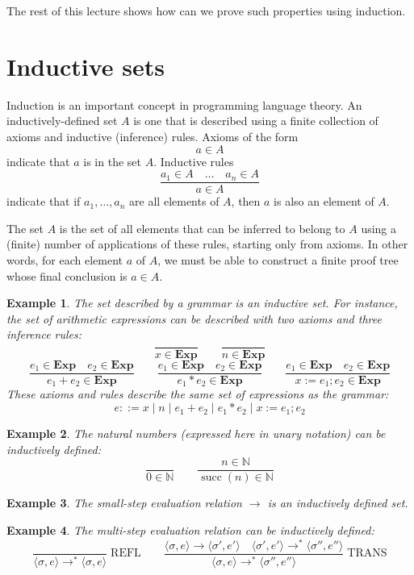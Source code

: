 \documentclass[11pt]{article}
\newtheorem{example}{Example}
\begin{document}
The rest of this lecture shows how can we prove such properties using induction.

\section{Inductive sets}

Induction is an important concept in programming language theory. An inductively-defined set
$A$ is one that is described using a finite collection of axioms and inductive (inference)
rules. Axioms of the form
\[
a \in A
\]
indicate that $a$ is in the set $A$. Inductive rules
\[
\frac{a_1 \in A \quad \ldots \quad a_n \in A}{a \in A}
\]
indicate that if $a_1, \ldots, a_n$ are all elements of $A$, then $a$ is also an element of $A$.

The set $A$ is the set of all elements that can be inferred to belong to $A$ using a (finite)
number of applications of these rules, starting only from axioms. In other words, for each
element $a$ of $A$, we must be able to construct a finite proof tree whose final conclusion is
$a \in A$.

\begin{example}
The set described by a grammar is an inductive set. For instance, the set of arithmetic
expressions can be described with two axioms and three inference rules:
\[
\frac{}{x \in \mathbf{Exp}} \qquad \frac{}{n \in \mathbf{Exp}}
\]
\[
\frac{e_1 \in \mathbf{Exp} \quad e_2 \in \mathbf{Exp}}{e_1 + e_2 \in \mathbf{Exp}} \qquad
\frac{e_1 \in \mathbf{Exp} \quad e_2 \in \mathbf{Exp}}{e_1 * e_2 \in \mathbf{Exp}} \qquad
\frac{e_1 \in \mathbf{Exp} \quad e_2 \in \mathbf{Exp}}{x := e_1 ; e_2 \in \mathbf{Exp}}
\]
These axioms and rules describe the same set of expressions as the grammar:
\[
e ::= x \mid n \mid e_1 + e_2 \mid e_1 * e_2 \mid x := e_1 ; e_2
\]
\end{example}

\begin{example}
The natural numbers (expressed here in unary notation) can be inductively defined:
\[
\frac{}{0 \in \mathbb{N}} \qquad \frac{n \in \mathbb{N}}{\operatorname{succ}(n) \in \mathbb{N}}
\]
\end{example}

\begin{example}
The small-step evaluation relation $\to$ is an inductively defined set.
\end{example}

\begin{example}
The multi-step evaluation relation can be inductively defined:
\[
\frac{}{\langle \sigma, e \rangle \to^* \langle \sigma, e \rangle} \; \text{REFL}
\qquad
\frac{\langle \sigma, e \rangle \to \langle \sigma', e' \rangle \quad \langle \sigma', e'
\rangle \to^* \langle \sigma'', e'' \rangle}{\langle \sigma, e \rangle \to^* \langle \sigma'',
e'' \rangle} \; \text{TRANS}
\]
\end{example}
\end{document}
